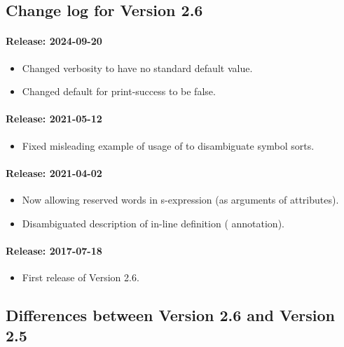 \subsection{Change log for Version 2.6}

\paragraph{Release: 2024-09-20}
\begin{itemize}
\item    Changed verbosity to have no standard default value.
\item    Changed default for print-success to be false.
\end{itemize}

\paragraph{Release: 2021-05-12}
\begin{itemize}
\item Fixed misleading example of usage of  to disambiguate symbol sorts.
\end{itemize}

\paragraph{Release: 2021-04-02}
\begin{itemize}
\item Now allowing reserved words in s-expression (as arguments of attributes).
\item Disambiguated description of in-line definition ( annotation).
\end{itemize}


\paragraph{Release: 2017-07-18}
\begin{itemize}
\item First release of Version 2.6.
\end{itemize}

\subsection{Differences between Version 2.6 and Version 2.5}

